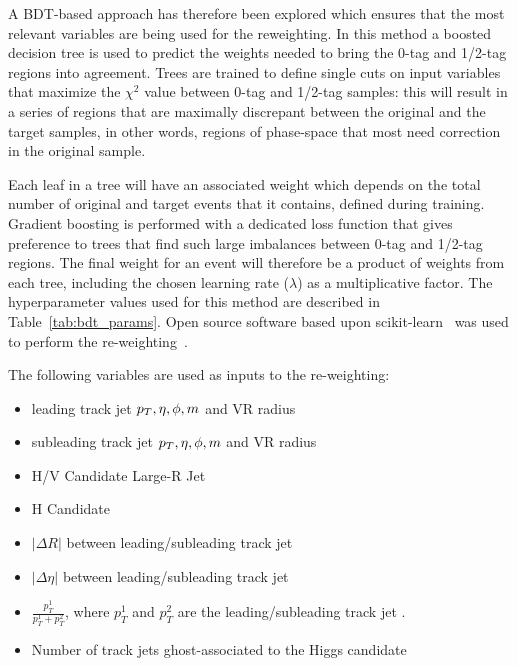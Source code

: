 A BDT-based approach \cite{BDTrw} has therefore been explored which ensures that the most relevant variables are being used for the reweighting.
In this method a boosted decision tree is used to predict the weights needed to bring the 0-tag and 1/2-tag regions into agreement.
Trees are trained to define single cuts on input variables that maximize the $\chi^{2}$ value between 0-tag and 1/2-tag samples: this will result in a series of regions that are maximally discrepant between the original and the target samples, in other words, regions of phase-space that most need correction in the original sample.

Each leaf in a tree will have an associated weight which depends on the total number of original and target events that it contains, defined during training.
Gradient boosting is performed with a dedicated loss function that gives preference to trees that find such large imbalances between 0-tag and 1/2-tag regions.
The final weight for an event will therefore be a product of weights from each tree, including the chosen learning rate ($\lambda$) as a multiplicative factor.
The hyperparameter values used for this method are described in Table~\ref{tab:bdt_params}.
Open source software based upon scikit-learn~\cite{scikitlearn} was used to perform the re-weighting~\cite{hep_ml:2020arg}.

The following variables are used as inputs to the re-weighting:
\begin{itemize}
    \itemsep0em 
    \item leading track jet $p_{T}, \eta, \phi, m$ and VR radius
    \item subleading track jet $p_{T}, \eta, \phi, m$ and VR radius
    \item H/V Candidate Large-R Jet \pt
    \item H Candidate \ntrk
    \item $\left|\Delta R \right|$ between leading/subleading track jet
    \item $\left|\Delta \eta \right|$ between leading/subleading track jet
    \item $\frac{p_T^1}{p_T^1 + p_T^2}$, where $p_T^1$ and $p_T^2$ are the leading/subleading track jet \pt.
    \item Number of track jets ghost-associated to the Higgs candidate
\end{itemize}

